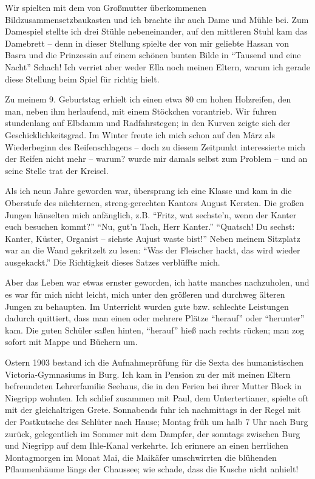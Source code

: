 \documentclass[a5paper,pagesize,10pt,twoside=true]{scrbook}
\begin{document}
Wir spielten mit dem von Großmutter überkommenen Bildzusammensetzbaukasten und ich brachte ihr auch Dame und Mühle bei. Zum Damespiel stellte ich drei Stühle nebeneinander, auf den mittleren Stuhl kam das Damebrett -- denn in dieser Stellung spielte der von mir geliebte Hassan von Basra und die Prinzessin auf einem schönen bunten Bilde in \enquote{Tausend und eine Nacht} Schach! Ich verriet aber weder Ella noch meinen Eltern, warum ich gerade diese Stellung beim Spiel für richtig hielt.

Zu meinem 9. Geburtstag erhielt ich einen etwa 80 cm hohen Holzreifen, den man, neben ihm herlaufend, mit einem Stöckchen vorantrieb. Wir fuhren stundenlang auf Elbdamm und Radfahrstegen; in den Kurven zeigte sich der Geschicklichkeitsgrad. Im Winter freute ich mich schon auf den März als Wiederbeginn des Reifenschlagens -- doch zu diesem Zeitpunkt interessierte mich der Reifen nicht mehr -- warum? wurde mir damals selbst zum Problem -- und an seine Stelle trat der Kreisel.

Als ich neun Jahre geworden war, übersprang ich eine Klasse und kam in die Oberstufe des nüchternen, streng-gerechten Kantors August Kersten. Die großen Jungen hänselten mich anfänglich, z.B. \enquote{Fritz, wat sechste'n, wenn der Kanter euch besuchen kommt?} \enquote{Nu, gut'n Tach, Herr Kanter.} \enquote{Quatsch! Du sechst: Kanter, Küster, Organist -- siehste Aujust waste bist!} Neben meinem Sitzplatz war an die Wand gekritzelt zu lesen: \enquote{Was der Fleischer hackt, das wird wieder ausgekackt.} Die Richtigkeit dieses Satzes verblüffte mich.

Aber das Leben war etwas ernster geworden, ich hatte manches nachzuholen, und es war für mich nicht leicht, mich unter den größeren und durchweg älteren Jungen zu behaupten. Im Unterricht wurden gute bzw. schlechte Leistungen dadurch quittiert, dass man einen oder mehrere Plätze \enquote{herauf} oder \enquote{herunter} kam. Die guten Schüler saßen hinten, \enquote{herauf} hieß nach rechts rücken; man zog sofort mit Mappe und Büchern um.

Ostern 1903 bestand ich die Aufnahmeprüfung für die Sexta des humanistischen Victoria-Gymnasiums in Burg. Ich kam in Pension zu der mit meinen Eltern befreundeten Lehrerfamilie Seehaus, die in den Ferien bei ihrer Mutter Block in Niegripp wohnten. Ich schlief zusammen mit Paul, dem Untertertianer, spielte oft mit der gleichaltrigen Grete. Sonnabends fuhr ich nachmittags in der Regel mit der Postkutsche des Schlüter nach Hause; Montag früh um halb 7 Uhr nach Burg zurück, gelegentlich im Sommer mit dem Dampfer, der sonntags zwischen Burg und Niegripp auf dem Ihle-Kanal verkehrte. Ich erinnere an einen herrlichen Montagmorgen im Monat Mai, die Maikäfer umschwirrten die blühenden Pflaumenbäume längs der Chaussee; wie schade, dass die Kusche nicht anhielt!
\end{document}
